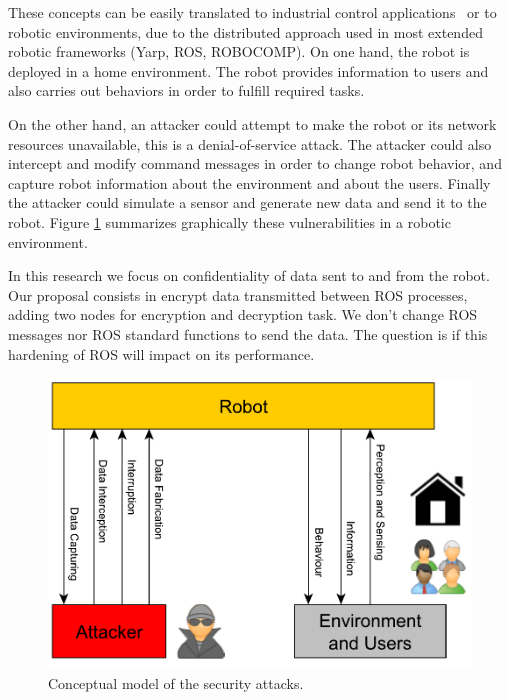 \documentclass[journal,twoside]{JoPhA}
\begin{document}
These concepts can be easily translated to industrial control applications~\cite{huitsing2008attack} or to robotic environments, due to the distributed approach used in most extended robotic frameworks (Yarp, ROS, ROBOCOMP). On one hand, the robot is deployed in a home environment. The robot provides information to users and also carries out behaviors in order to fulfill required tasks. 

On the other hand, an attacker could attempt to make the robot or its network resources unavailable, this is a denial-of-service attack. The attacker could also intercept and modify command messages in order to change robot behavior, and capture robot information about the environment and about the users. Finally the attacker could simulate a sensor and generate new data and send it to the robot. Figure \ref{fig:Conceptualmodel} summarizes graphically these vulnerabilities in a robotic environment.

In this research we focus on confidentiality of data sent to and from the robot. Our proposal consists in encrypt data transmitted between ROS processes, adding two nodes for encryption and decryption task. We don't change ROS messages nor ROS standard functions to send the data. The question is if this hardening of ROS will impact on its performance.



\begin{figure}[ht]
    \centering
    \includegraphics[width=.5\textwidth]{RobotsAttacks.pdf}
    \caption{Conceptual model of the security attacks.}
  \label{fig:Conceptualmodel}
\end{figure}
\end{document}
